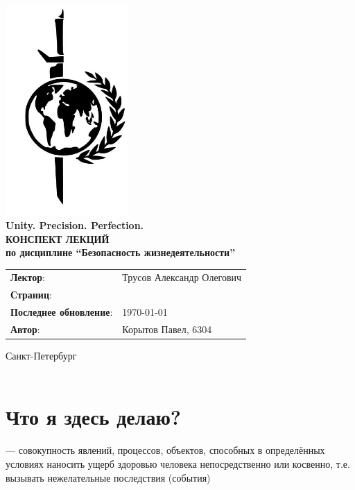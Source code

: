 \documentclass[a4paper, 14pt]{extarticle}
\begin{document}
\begin{titlepage}
    {\centering
        {\bfseries
            \includegraphics[height=8cm]{../res/logo.jpeg}\\
            Unity. Precision. Perfection.\\
            \vspace{3.5cm}
            \uppercase{Конспект лекций} \\
            по дисциплине \enquote{Безопасность жизнедеятельности}\\
        }
        \vspace{\fill}
    }
    \begin{tabular}{l l}
        \textbf{Лектор}: & Трусов Александр Олегович\\
        \textbf{Страниц}: &\pageref{LastPage}\\
        \textbf{Последнее обновление}: & \today{}\\ 
        \textbf{Автор}: & Корытов Павел, 6304\\
    \end{tabular}

    \vspace{2cm}
    {\centering
        Санкт-Петербург \\
        \the\year\\
    }
\end{titlepage}

\tableofcontents
\newpage

\section{Что я здесь делаю?}
 --- совокупность явлений, процессов, объектов, способных в определённых условиях наносить ущерб здоровью человека непосредственно или косвенно, т.е. вызывать нежелательные последствия (события)
\end{document}
